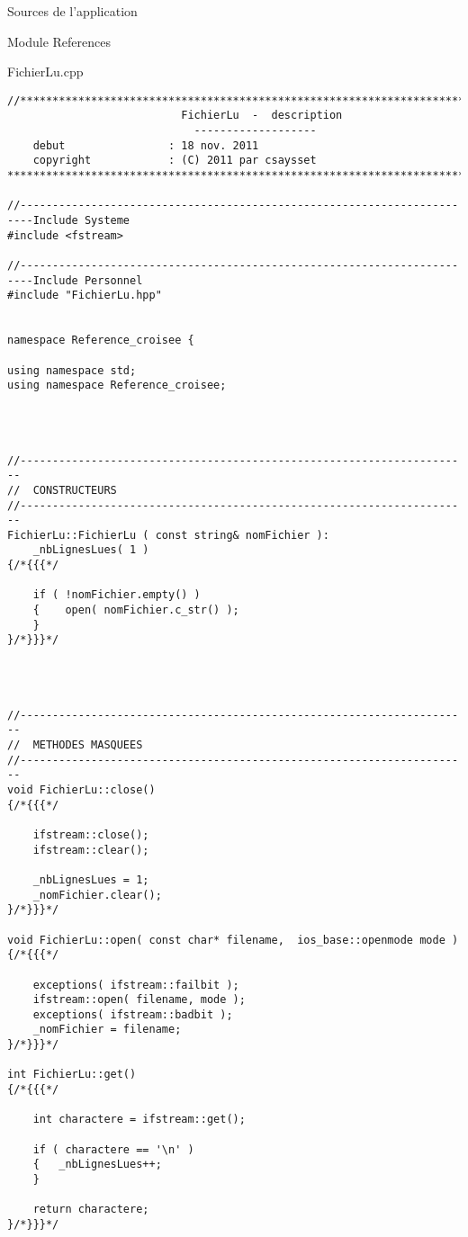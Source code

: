 \documentclass{article}
\begin{document}
\begin{section}{Sources de l'application}
\begin{subsection}{Module References}
\newpage
  \begin{paragraph}{FichierLu.cpp}
   \begin{verbatim}
//*************************************************************************
                           FichierLu  -  description
                             -------------------
    debut                : 18 nov. 2011
    copyright            : (C) 2011 par csaysset
*************************************************************************/

//------------------------------------------------------------------------Include Systeme
#include <fstream>

//------------------------------------------------------------------------Include Personnel
#include "FichierLu.hpp"


namespace Reference_croisee {

using namespace std;
using namespace Reference_croisee;




//----------------------------------------------------------------------
//  CONSTRUCTEURS
//----------------------------------------------------------------------
FichierLu::FichierLu ( const string& nomFichier ):
    _nbLignesLues( 1 )
{/*{{{*/

    if ( !nomFichier.empty() ) 
    {    open( nomFichier.c_str() );
    }
}/*}}}*/




//----------------------------------------------------------------------
//  METHODES MASQUEES
//----------------------------------------------------------------------
void FichierLu::close()
{/*{{{*/

    ifstream::close();
    ifstream::clear();

    _nbLignesLues = 1;
    _nomFichier.clear();
}/*}}}*/

void FichierLu::open( const char* filename,  ios_base::openmode mode )
{/*{{{*/

    exceptions( ifstream::failbit );
    ifstream::open( filename, mode );
    exceptions( ifstream::badbit );
    _nomFichier = filename;
}/*}}}*/

int FichierLu::get()
{/*{{{*/

    int charactere = ifstream::get();

    if ( charactere == '\n' ) 
    {	_nbLignesLues++;
    }

    return charactere;
}/*}}}*/




\end{verbatim}
\end{paragraph}
\end{subsection}
\end{section}
\end{document}
